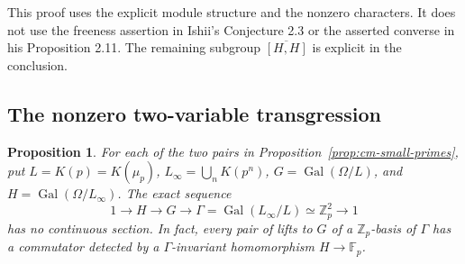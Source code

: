 \documentclass[11pt]{article}
\newtheorem{proposition}[theorem]{Proposition}
\theoremstyle{definition}\newtheorem{definition}[theorem]{Definition}
\begin{document}
This proof uses the explicit module structure and the
nonzero characters. It does not use the freeness assertion
in Ishii's Conjecture 2.3 or the asserted converse in his
Proposition 2.11. The remaining subgroup
\(\overline{[H,H]}\) is explicit in the conclusion.

\subsection{The nonzero two-variable transgression}

\begin{proposition}\label{prop:cm-nonsplit}
For each of the two pairs in Proposition~\ref{prop:cm-small-primes},
put \(L=K(p)=K(\mu_p)\), \(L_\infty=\bigcup_nK(p^n)\),
\(G=\operatorname{Gal}(\Omega/L)\), and
\(H=\operatorname{Gal}(\Omega/L_\infty)\).
The exact sequence
\[
 1\longrightarrow H\longrightarrow G\longrightarrow
 \Gamma=\operatorname{Gal}(L_\infty/L)\simeq\mathbb Z_p^2
 \longrightarrow1
\]
has no continuous section. In fact, every pair of lifts to \(G\)
of a \(\mathbb Z_p\)-basis of \(\Gamma\) has a commutator detected
by a \(\Gamma\)-invariant homomorphism \(H\to\mathbb F_p\).
\end{proposition}
\end{document}
